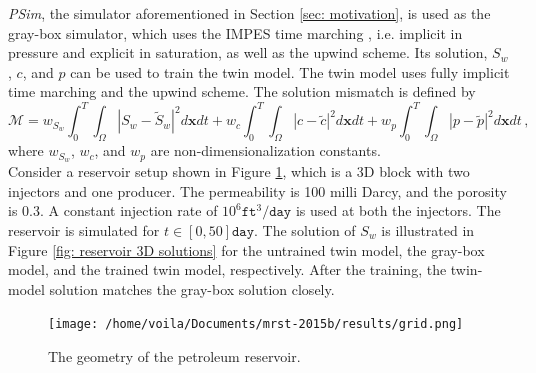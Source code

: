 \emph{PSim}, the simulator aforementioned in Section \ref{sec: motivation}, is
used as the gray-box simulator, which uses the IMPES time marching 
\cite{reservoir sim book}, i.e. implicit in pressure
and explicit in saturation, as well as the upwind scheme.
Its solution, $S_w$, $c$, and $p$ can be used to train the 
twin model. The twin model uses fully implicit time marching and the upwind scheme.
The solution mismatch is defined by
\begin{equation}
    \mathcal{M} = w_{S_w}\int_0^T\int_\Omega |S_w-\tilde{S}_w|^2 d\boldsymbol{x} dt
                + w_{c}\int_0^T\int_\Omega |c-\tilde{c}|^2 d\boldsymbol{x} dt 
                + w_{p}\int_{0}^T\int_\Omega |p-\tilde{p}|^2 d\boldsymbol{x} dt\,,
    \label{eqn: polymer sol mismatch}
\end{equation}
where $w_{S_w}$, $w_c$, and $w_p$ are non-dimensionalization constants.\\


Consider a reservoir setup shown in Figure \ref{fig: reservoir 3D mesh}, which
is a 3D block with two injectors and one producer. The permeability
is 100 milli Darcy, and the porosity is 0.3. A constant injection rate of $10^6 
\texttt{ft}^3/\texttt{day}$ is used at both the injectors.
The reservoir is simulated for $t\in [0,50] \texttt{day}$.
The solution of $S_w$ is illustrated in Figure \ref{fig: reservoir 3D solutions} for the untrained 
twin model, the gray-box model, and the trained twin model, respectively. 
After the training, the twin-model solution matches the gray-box solution closely.\\

\begin{figure}[htbp]
    \begin{center}
        \texttt{[image: /home/voila/Documents/mrst-2015b/results/grid.png]}
        \caption{The geometry of the petroleum reservoir.}
        \label{fig: reservoir 3D mesh}
    \end{center}
\end{figure}

